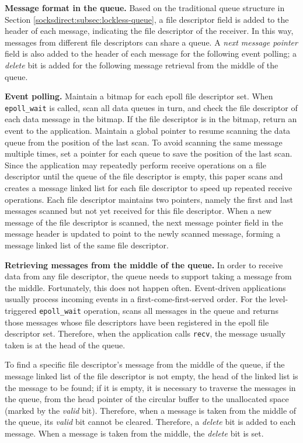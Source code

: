 \textbf{Message format in the queue.}
Based on the traditional queue structure in Section \ref{socksdirect:subsec:lockless-queue}, a file descriptor field is added to the header of each message, indicating the file descriptor of the receiver. In this way, messages from different file descriptors can share a queue. A \textit{next message pointer} field is also added to the header of each message for the following event polling; a \textit{delete} bit is added for the following message retrieval from the middle of the queue.

\textbf{Event polling.}
Maintain a bitmap for each epoll file descriptor set.
When \texttt{epoll\_wait} is called, scan all data queues in turn, and check the file descriptor of each data message in the bitmap.
If the file descriptor is in the bitmap, return an event to the application.
Maintain a global pointer to resume scanning the data queue from the position of the last scan.
To avoid scanning the same message multiple times, set a pointer for each queue to save the position of the last scan.
Since the application may repeatedly perform receive operations on a file descriptor until the queue of the file descriptor is empty, this paper scans and creates a message linked list for each file descriptor to speed up repeated receive operations.
Each file descriptor maintains two pointers, namely the first and last messages scanned but not yet received for this file descriptor.
When a new message of the file descriptor is scanned, the next message pointer field in the message header is updated to point to the newly scanned message, forming a message linked list of the same file descriptor.

\textbf{Retrieving messages from the middle of the queue.}
In order to receive data from any file descriptor, the queue needs to support taking a message from the middle.
Fortunately, this does not happen often. Event-driven applications usually process incoming events in a first-come-first-served order.
For the level-triggered \texttt{epoll\_wait} operation, \libipc{} scans all messages in the queue and returns those messages whose file descriptors have been registered in the epoll file descriptor set.
Therefore, when the application calls \texttt{recv}, the message usually taken is at the head of the queue.

To find a specific file descriptor's message from the middle of the queue, if the message linked list of the file descriptor is not empty, the head of the linked list is the message to be found; if it is empty, it is necessary to traverse the messages in the queue, from the head pointer of the circular buffer to the unallocated space (marked by the \textit{valid} bit). Therefore, when a message is taken from the middle of the queue, its \textit{valid} bit cannot be cleared. Therefore, a \textit{delete} bit is added to each message. When a message is taken from the middle, the \textit{delete} bit is set.

